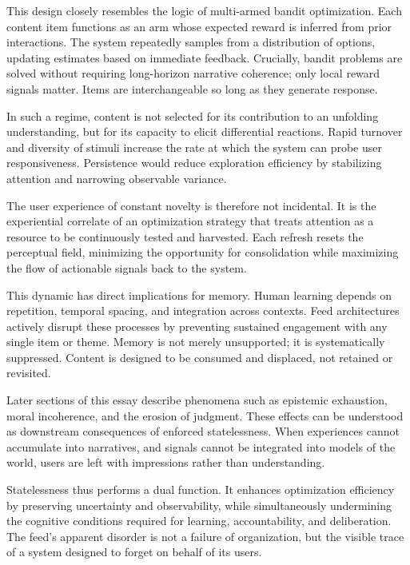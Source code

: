 \documentclass[12pt]{article}
\begin{document}
This design closely resembles the logic of multi-armed bandit optimization. Each content item functions as an arm whose expected reward is inferred from prior interactions. The system repeatedly samples from a distribution of options, updating estimates based on immediate feedback. Crucially, bandit problems are solved without requiring long-horizon narrative coherence; only local reward signals matter. Items are interchangeable so long as they generate response.

In such a regime, content is not selected for its contribution to an unfolding understanding, but for its capacity to elicit differential reactions. Rapid turnover and diversity of stimuli increase the rate at which the system can probe user responsiveness. Persistence would reduce exploration efficiency by stabilizing attention and narrowing observable variance.

The user experience of constant novelty is therefore not incidental. It is the experiential correlate of an optimization strategy that treats attention as a resource to be continuously tested and harvested. Each refresh resets the perceptual field, minimizing the opportunity for consolidation while maximizing the flow of actionable signals back to the system.

This dynamic has direct implications for memory. Human learning depends on repetition, temporal spacing, and integration across contexts. Feed architectures actively disrupt these processes by preventing sustained engagement with any single item or theme. Memory is not merely unsupported; it is systematically suppressed. Content is designed to be consumed and displaced, not retained or revisited.

Later sections of this essay describe phenomena such as epistemic exhaustion, moral incoherence, and the erosion of judgment. These effects can be understood as downstream consequences of enforced statelessness. When experiences cannot accumulate into narratives, and signals cannot be integrated into models of the world, users are left with impressions rather than understanding.

Statelessness thus performs a dual function. It enhances optimization efficiency by preserving uncertainty and observability, while simultaneously undermining the cognitive conditions required for learning, accountability, and deliberation. The feed’s apparent disorder is not a failure of organization, but the visible trace of a system designed to forget on behalf of its users.
\end{document}
